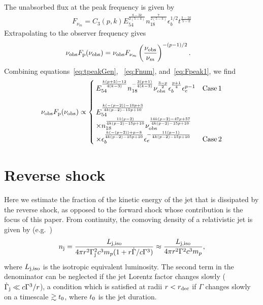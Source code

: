 \documentclass[usenatbib,fleqn]{mnras}
\begin{document}
The unabsorbed flux at the peak frequency is given by
\begin{align}
  F_{\nu_m} =  C_3(p, k) E_{54}^{\frac{8-3 k}{2 (5-k)}}
  n_{18}^{\frac{7}{2 (5-k)}} \epsilon_b^{1/2} t^{\frac{3-2 k}{5-k}}
\label{eq:Fnum}
\end{align}
%
Extrapolating to the observer frequency gives 
\begin{align}
  \nu_{\rm obs} F_{\rm p} (\nu_{\rm obs}) &= \nu_{\rm obs}   F_{\nu_m}
  \left(\frac{\nu_{\rm obs}}{\nu_m}\right)^{-(p-1)/2}.
  \label{eq:Fpeak1}
\end{align}
%
Combining equations~\eqref{eq:tpeakGen}, ~\eqref{eq:Fnum},
and~\eqref{eq:Fpeak1}, we find
\begin{align}
  \nu_{\rm obs} F_{\rm p} (\nu_{\rm obs}) \propto
  \begin{cases}
    E_{54}^{\frac{k (p+5)-12}{4 (k-3)}} n_{18}^{-\frac{3 (p+1)}{4
        (k-3)}} \nu_{\rm obs}^{\frac{3-p}{2}}
    \epsilon_b^{\frac{p+1}{4}} \epsilon_e^{p-1} & {\rm Case \,
      1}\\\\
    E_{54}^{\frac{k(-(p-2))-10 p+3}{4 k (p-2)-15 p+10}} \\ \times
    n_{18}^{\frac{11 (p-2)}{4 k (p-2)-15 p+10}} \nu_{\rm
      obs}^{\frac{14 k (p-2)-47 p+57}{4 k (p-2)-15 p+10}} \\ \times
    \epsilon_b^{\frac{k (-(p-2))+p-8}{4 k(p-2)-15 p+10}}
    \epsilon_e^{-\frac{11 (p-1)}{4 k (p-2)-15p+10}} & {\rm Case \, 2}
  \end{cases}
  \label{eq:peakLumGen}
\end{align}


\section{Reverse shock}
\label{sec:reverse}
Here we estimate the fraction of the kinetic energy of the jet that is
dissipated by the reverse shock, as opposed to the forward shock whose
contribution is the focus of this paper.  From continuity, the
comoving density of a relativistic jet is given by
(e.g.~\citealt{Beloborodov&Uhm2006})
 \begin{align}
   n_{\rm j} =  \frac{L_{\rm j, iso}}{4 \pi r^{2}\Gamma_{\rm
       j}^{2}c^{3}m_p(1 + r \dot{\Gamma}/c\Gamma^{3})}
   \approx  \frac{L_{\rm j, iso}}{4 \pi r^{2}\Gamma^{2}c^{3}m_p},
\end{align}
%
where $L_{\rm j, iso}$ is the isotropic equivalent luminosity.  The
second term in the denominator can be neglected if the jet Lorentz
factor changes slowly ($\dot{\Gamma}_{\rm j} \ll c\Gamma^{3}/r$), a
condition which is satisfied at radii $r < r_{\rm dec}$ if $\Gamma$
changes slowly on a timescale $\gtrsim t_{\rm 0}$, where $t_{\rm 0}$
is the jet duration.
\end{document}
